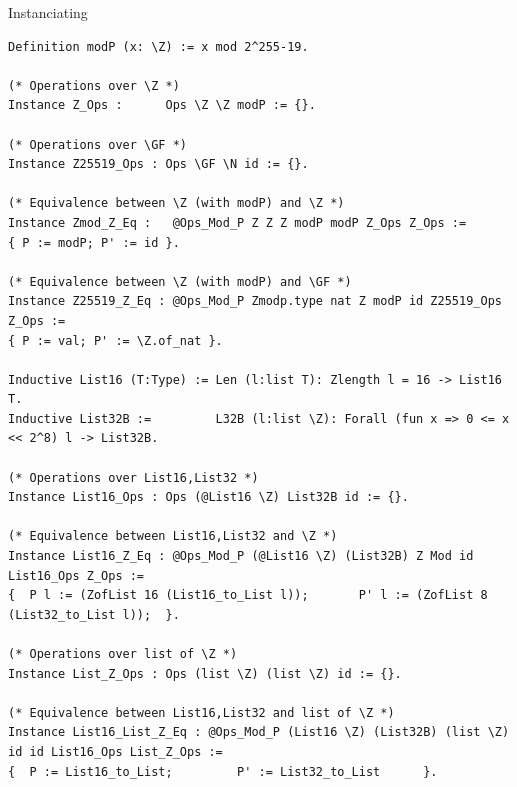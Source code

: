\documentclass[8pt]{beamer}
\begin{document}
\begin{frame}[fragile]{Instanciating}
\vspace{-0.5cm}
\begin{center}
\begin{lstlisting}[language=Coq]
Definition modP (x: \Z) := x mod 2^255-19.

(* Operations over \Z *)
Instance Z_Ops :      Ops \Z \Z modP := {}.

(* Operations over \GF *)
Instance Z25519_Ops : Ops \GF \N id := {}.

(* Equivalence between \Z (with modP) and \Z *)
Instance Zmod_Z_Eq :   @Ops_Mod_P Z Z Z modP modP Z_Ops Z_Ops :=
{ P := modP; P' := id }.

(* Equivalence between \Z (with modP) and \GF *)
Instance Z25519_Z_Eq : @Ops_Mod_P Zmodp.type nat Z modP id Z25519_Ops Z_Ops :=
{ P := val; P' := \Z.of_nat }.

Inductive List16 (T:Type) := Len (l:list T): Zlength l = 16 -> List16 T.
Inductive List32B :=         L32B (l:list \Z): Forall (fun x => 0 <= x << 2^8) l -> List32B.

(* Operations over List16,List32 *)
Instance List16_Ops : Ops (@List16 \Z) List32B id := {}.

(* Equivalence between List16,List32 and \Z *)
Instance List16_Z_Eq : @Ops_Mod_P (@List16 \Z) (List32B) Z Mod id List16_Ops Z_Ops :=
{  P l := (ZofList 16 (List16_to_List l));       P' l := (ZofList 8 (List32_to_List l));  }.

(* Operations over list of \Z *)
Instance List_Z_Ops : Ops (list \Z) (list \Z) id := {}.

(* Equivalence between List16,List32 and list of \Z *)
Instance List16_List_Z_Eq : @Ops_Mod_P (List16 \Z) (List32B) (list \Z) id id List16_Ops List_Z_Ops :=
{  P := List16_to_List;         P' := List32_to_List      }.
\end{lstlisting}
\end{center}
\end{frame}
\end{document}
